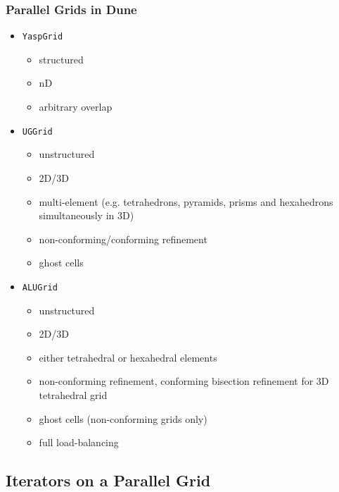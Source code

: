 \begin{frame}
  \frametitle<presentation>{Parallel Grids in Dune}
  \begin{itemize}
  \item<1-> \lstinline!YaspGrid!
      \begin{itemize}
      \item structured
      \item nD
      \item arbitrary overlap
      \end{itemize}
  \item<2-> \lstinline!UGGrid!
      \begin{itemize}
      \item unstructured
      \item 2D/3D
      \item multi-element (e.g. tetrahedrons, pyramids, prisms and hexahedrons simultaneously in 3D)
      \item non-conforming/conforming refinement
      \item ghost cells
      \end{itemize}
  \item<3-> \lstinline!ALUGrid!
      \begin{itemize}
      \item unstructured
      \item 2D/3D
      \item either tetrahedral or hexahedral elements
      \item non-conforming refinement, conforming bisection refinement for 3D tetrahedral grid
      \item ghost cells (non-conforming grids only)
      \item full load-balancing
      \end{itemize}
  \end{itemize}
\end{frame}

\subsection{Iterators on a Parallel Grid}

